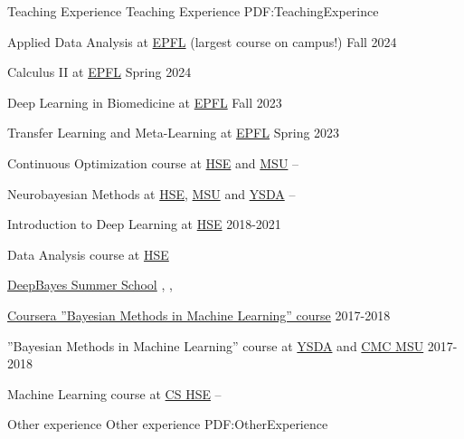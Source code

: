\documentclass[letterpaper,MMMyyyy,nonstopmode]{simpleresumecv}
\begin{document}
\begin{Body}

\Section
{Teaching Experience}
{Teaching Experience}
{PDF:TeachingExperince}

\Entry
Applied Data Analysis at \href{https://edu.epfl.ch/coursebook/en/applied-data-analysis-CS-401}{EPFL} (largest course on campus!)
\hfill
Fall 2024
\Gap

\Entry
Calculus II at \href{https://edu.epfl.ch/coursebook/en/analysis-ii-MATH-106-E}{EPFL}
\hfill
Spring 2024
\Gap

\Entry
Deep Learning in Biomedicine at \href{https://edu.epfl.ch/coursebook/en/deep-learning-in-biomedicine-CS-502}{EPFL}
\hfill
Fall 2023
\Gap

\Entry
Transfer Learning and Meta-Learning at \href{https://edu.epfl.ch/coursebook/en/transfer-learning-and-meta-learning-CS-625}{EPFL}
\hfill
Spring 2023
\Gap

\Entry
Continuous Optimization course at \href{https://cs.hse.ru/en/}{HSE} and \href{https://cs.msu.ru/en}{MSU}
\hfill
{} --
\Gap

\Entry
Neurobayesian Methods at \href{https://cs.hse.ru/en/}{HSE}, \href{https://cs.msu.ru/en}{MSU} and \href{https://yandexdataschool.com}{YSDA}
\hfill
{} --
\Gap

\Entry
Introduction to Deep Learning at \href{https://cs.hse.ru/en/}{HSE}
\hfill
2018-2021
\Gap

\Entry
Data Analysis course at \href{https://cs.hse.ru/en/}{HSE}
\hfill
{}
\Gap

\Entry
\href{http://deepbayes.ru}{DeepBayes Summer School}
\hfill
{}, , 
\Gap

\Entry
\href{https://www.coursera.org/learn/bayesian-methods-in-machine-learning}
{Coursera ”Bayesian Methods in Machine Learning” course}
\hfill
2017-2018
\Gap

\Entry
”Bayesian Methods in Machine Learning” course at \href{https://yandexdataschool.com}{YSDA}
and \href{https://cs.msu.ru/en}{CMC MSU}
\hfill
2017-2018
\Gap

\Entry
Machine Learning course at \href{https://cs.hse.ru/en/}{CS HSE}
\hfill
{} --
\Gap


\Section
{Other experience}
{Other experience}
{PDF:OtherExperience}


\end{Body}
\end{document}
